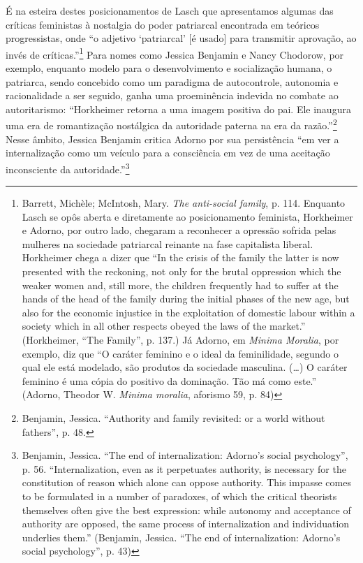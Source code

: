 É na esteira destes posicionamentos de Lasch que apresentamos algumas
das críticas feministas à nostalgia do poder patriarcal encontrada em
teóricos progressistas, onde ``o adjetivo `patriarcal' {[}é usado{]}
para transmitir aprovação, ao invés de críticas.''\footnote{Barrett,
  Michèle; McIntosh, Mary. \emph{The anti-social family}, p. 114.
  Enquanto Lasch se opôs aberta e diretamente ao posicionamento
  feminista, Horkheimer e Adorno, por outro lado, chegaram a reconhecer
  a opressão sofrida pelas mulheres na sociedade patriarcal reinante na
  fase capitalista liberal. Horkheimer chega a dizer que ``In the crisis
  of the family the latter is now presented with the reckoning, not only
  for the brutal oppression which the weaker women and, still more, the
  children frequently had to suffer at the hands of the head of the
  family during the initial phases of the new age, but also for the
  economic injustice in the exploitation of domestic labour within a
  society which in all other respects obeyed the laws of the market.''
  (Horkheimer, ``The Family'', p. 137.) Já Adorno, em \emph{Minima
  Moralia}, por exemplo, diz que ``O caráter feminino e o ideal da
  feminilidade, segundo o qual ele está modelado, são produtos da
  sociedade masculina. (\ldots{}) O caráter feminino é uma cópia do positivo
  da dominação. Tão má como este.'' (Adorno, Theodor W. \emph{Minima
  moralia}, aforismo 59, p. 84)} Para nomes como Jessica Benjamin e
Nancy Chodorow, por exemplo, enquanto modelo para o desenvolvimento e
socialização humana, o patriarca, sendo concebido como um paradigma de
autocontrole, autonomia e racionalidade a ser seguido, ganha uma
proeminência indevida no combate ao autoritarismo: ``Horkheimer retorna
a uma imagem positiva do pai. Ele inaugura uma era de romantização
nostálgica da autoridade paterna na era da razão.''\footnote{Benjamin,
  Jessica. ``Authority and family revisited: or a world without
  fathers'', p. 48.} Nesse âmbito, Jessica Benjamin critica Adorno por
sua persistência ``em ver a internalização como um veículo para a
consciência em vez de uma aceitação inconsciente da
autoridade.''\footnote{Benjamin, Jessica. ``The end of internalization:
  Adorno's social psychology'', p. 56. ``Internalization, even as it
  perpetuates authority, is necessary for the constitution of reason
  which alone can oppose authority. This impasse comes to be formulated
  in a number of paradoxes, of which the critical theorists themselves
  often give the best expression: while autonomy and acceptance of
  authority are opposed, the same process of internalization and
  individuation underlies them.'' (Benjamin, Jessica. ``The end of
  internalization: Adorno's social psychology'', p. 43)}

